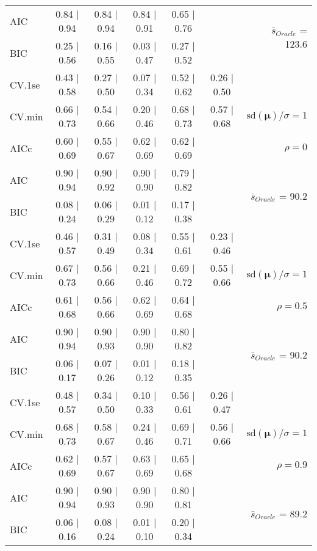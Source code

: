 \begin{table}
\begin{center}
\begin{tabular}{l*{5}{c}|r}
AIC & 0.84 $\mid$ 0.94 & 0.84 $\mid$ 0.94 & 0.84 $\mid$ 0.91 & 0.65 $\mid$ 0.76 & &  \multirow{2}{*}{$\bar{s}_{Oracle}$ = 123.6} \\
BIC & 0.25 $\mid$ 0.56 & 0.16 $\mid$ 0.55 & 0.03 $\mid$ 0.47 & 0.27 $\mid$ 0.52 & &  \\
 \hline 
CV.1se & 0.43 $\mid$ 0.58 & 0.27 $\mid$ 0.50 & 0.07 $\mid$ 0.34 & 0.52 $\mid$ 0.62 & 0.26 $\mid$ 0.50 & \\
CV.min & 0.66 $\mid$ 0.73 & 0.54 $\mid$ 0.66 & 0.20 $\mid$ 0.46 & 0.68 $\mid$ 0.73 & 0.57 $\mid$ 0.68 &  $\mathrm{sd}(\mathbf{\mu})/\sigma=1$ \\
AICc & 0.60 $\mid$ 0.69 & 0.55 $\mid$ 0.67 & 0.62 $\mid$ 0.69 & 0.62 $\mid$ 0.69 & & $\rho=0$ \\
AIC & 0.90 $\mid$ 0.94 & 0.90 $\mid$ 0.92 & 0.90 $\mid$ 0.90 & 0.79 $\mid$ 0.82 & &  \multirow{2}{*}{$\bar{s}_{Oracle}$ = 90.2} \\
BIC & 0.08 $\mid$ 0.24 & 0.06 $\mid$ 0.29 & 0.01 $\mid$ 0.12 & 0.17 $\mid$ 0.38 & &  \\
 \hline 
CV.1se & 0.46 $\mid$ 0.57 & 0.31 $\mid$ 0.49 & 0.08 $\mid$ 0.34 & 0.55 $\mid$ 0.61 & 0.23 $\mid$ 0.46 & \\
CV.min & 0.67 $\mid$ 0.73 & 0.56 $\mid$ 0.66 & 0.21 $\mid$ 0.46 & 0.69 $\mid$ 0.72 & 0.55 $\mid$ 0.66 &  $\mathrm{sd}(\mathbf{\mu})/\sigma=1$ \\
AICc & 0.61 $\mid$ 0.68 & 0.56 $\mid$ 0.66 & 0.62 $\mid$ 0.69 & 0.64 $\mid$ 0.68 & & $\rho=0.5$ \\
AIC & 0.90 $\mid$ 0.94 & 0.90 $\mid$ 0.93 & 0.90 $\mid$ 0.90 & 0.80 $\mid$ 0.82 & &  \multirow{2}{*}{$\bar{s}_{Oracle}$ = 90.2} \\
BIC & 0.06 $\mid$ 0.17 & 0.07 $\mid$ 0.26 & 0.01 $\mid$ 0.12 & 0.18 $\mid$ 0.35 & &  \\
 \hline 
CV.1se & 0.48 $\mid$ 0.57 & 0.34 $\mid$ 0.50 & 0.10 $\mid$ 0.33 & 0.56 $\mid$ 0.61 & 0.26 $\mid$ 0.47 & \\
CV.min & 0.68 $\mid$ 0.73 & 0.58 $\mid$ 0.67 & 0.24 $\mid$ 0.46 & 0.69 $\mid$ 0.71 & 0.56 $\mid$ 0.66 &  $\mathrm{sd}(\mathbf{\mu})/\sigma=1$ \\
AICc & 0.62 $\mid$ 0.69 & 0.57 $\mid$ 0.67 & 0.63 $\mid$ 0.69 & 0.65 $\mid$ 0.68 & & $\rho=0.9$ \\
AIC & 0.90 $\mid$ 0.94 & 0.90 $\mid$ 0.93 & 0.90 $\mid$ 0.90 & 0.80 $\mid$ 0.81 & &  \multirow{2}{*}{$\bar{s}_{Oracle}$ = 89.2} \\
BIC & 0.06 $\mid$ 0.16 & 0.08 $\mid$ 0.24 & 0.01 $\mid$ 0.10 & 0.20 $\mid$ 0.34 & &  \\

\end{tabular}
\end{center}
\end{table}
